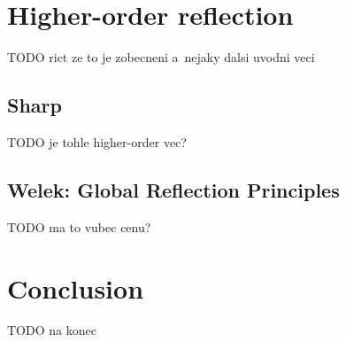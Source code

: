 \documentclass[12pt,a4paper]{article}
\begin{document}
\section{Higher-order reflection} %
TODO rict ze to je zobecneni a~nejaky dalsi uvodni veci

\subsection{Sharp}
TODO je tohle higher-order vec?

\subsection{Welek: Global Reflection Principles}
TODO ma to vubec cenu?

\newpage
\section{Conclusion}
TODO na konec

\newpage


\end{document}
